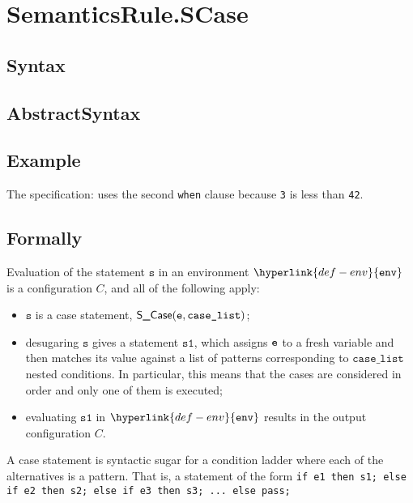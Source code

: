 \documentclass{book}
\newcommand\caselist[0]{\texttt{case\_list}}
\newcommand\env[0]{\hyperlink{def-env}{\texttt{env}}}
\newcommand\vs[0]{\texttt{s}}
\newcommand\vsone[0]{\texttt{s1}}
\begin{document}


\section{SemanticsRule.SCase \label{sec:SemanticsRule.SCase}}

\subsection{Syntax}

\subsection{AbstractSyntax}

\subsection{Example}
    The specification:
    uses the second \texttt{when} clause because \texttt{3} is less than \texttt{42}.

\subsection{Formally}
    Evaluation of the statement $\vs$ in an environment $\env$ is a configuration $C$,
    and all of the following apply:
    \begin{itemize}
    \item $\vs$ is a case statement, $\SCase(\ve, \caselist)$;
    \item desugaring $\vs$ gives a statement $\vsone$, which assigns $\texttt{e}$ to a fresh variable
    and then matches its value against a list of patterns corresponding to $\caselist$ nested conditions.
    In particular, this means that the cases are considered in order and only one of them is executed;
    \item evaluating $\vsone$ in $\env$ results in the output configuration $C$.
    \end{itemize}


  \hypertarget{def-casetoconds}{}
A case statement is syntactic sugar for a condition ladder where each
of the alternatives is a pattern.
That is, a statement of the form
\texttt{if e1 then s1; else if e2 then s2; else if e3 then s3; ... else pass;}
\end{document}
